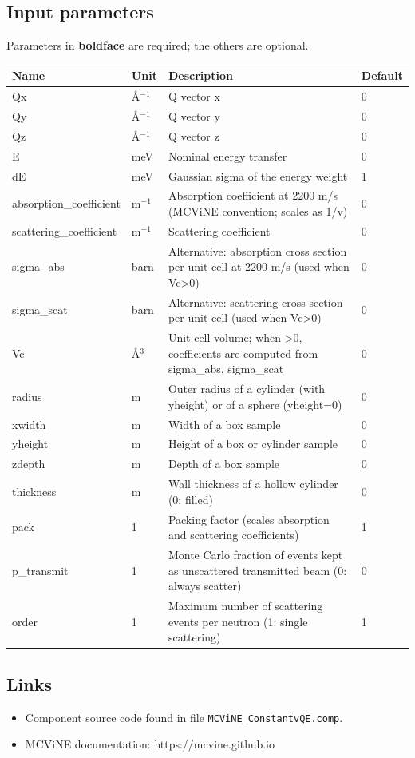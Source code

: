 \subsection*{Input parameters}
Parameters in \textbf{boldface} are required; the others are optional.

\begin{longtable}{p{}p{}p{}p{}}
\toprule
\textbf{Name} & \textbf{Unit} & \textbf{Description} & \textbf{Default} \\
\midrule
\endhead
Qx & \AA{}$^{-1}$ & Q vector x & 0 \\
Qy & \AA{}$^{-1}$ & Q vector y & 0 \\
Qz & \AA{}$^{-1}$ & Q vector z & 0 \\
E & meV & Nominal energy transfer & 0 \\
dE & meV & Gaussian sigma of the energy weight & 1 \\
absorption\_coefficient & m$^{-1}$ & Absorption coefficient at 2200 m/s (MCViNE convention; scales as 1/v) & 0 \\
scattering\_coefficient & m$^{-1}$ & Scattering coefficient & 0 \\
sigma\_abs & barn & Alternative: absorption cross section per unit cell at 2200 m/s (used when Vc\textgreater{}0) & 0 \\
sigma\_scat & barn & Alternative: scattering cross section per unit cell (used when Vc\textgreater{}0) & 0 \\
Vc & \AA{}$^{3}$ & Unit cell volume; when \textgreater{}0, coefficients are computed from sigma\_abs, sigma\_scat & 0 \\
radius & m & Outer radius of a cylinder (with yheight) or of a sphere (yheight=0) & 0 \\
xwidth & m & Width of a box sample & 0 \\
yheight & m & Height of a box or cylinder sample & 0 \\
zdepth & m & Depth of a box sample & 0 \\
thickness & m & Wall thickness of a hollow cylinder (0: filled) & 0 \\
pack & 1 & Packing factor (scales absorption and scattering coefficients) & 1 \\
p\_transmit & 1 & Monte Carlo fraction of events kept as unscattered transmitted beam (0: always scatter) & 0 \\
order & 1 & Maximum number of scattering events per neutron (1: single scattering) & 1 \\
\bottomrule
\end{longtable}

\subsection*{Links}
\begin{itemize}
  \item Component source code found in file \texttt{MCViNE\_ConstantvQE.comp}.
  \item MCViNE documentation: https://mcvine.github.io
\end{itemize}
